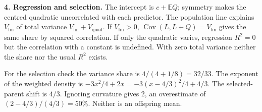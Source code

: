 \documentclass[11pt]{article}
\newcommand{\E}{\mathbb E}
\newcommand{\Vlin}{V_{\mathrm{lin}}}
\newcommand{\Vquad}{V_{\mathrm{quad}}}
\newcommand{\Cov}{\operatorname{Cov}}
\begin{document}
\textbf{4. Regression and selection.} The intercept is $c+\E Q$; symmetry makes the centred quadratic uncorrelated with each predictor. The population line explains $\Vlin$ of total variance $\Vlin+\Vquad$. If $\Vlin>0$, $\Cov(L,L+Q)=\Vlin$ gives the same share by squared correlation. If only the quadratic varies, regression $R^2=0$ but the correlation with a constant is undefined. With zero total variance neither the share nor the usual $R^2$ exists.

For the selection check the variance share is $4/(4+1/8)=32/33$. The exponent of the weighted density is $-3x^2/4+2x=-3(x-4/3)^2/4+4/3$. The selected-parent shift is $4/3$. Ignoring curvature gives 2, an overestimate of $(2-4/3)/(4/3)=50\%$. Neither is an offspring mean.
\end{document}
